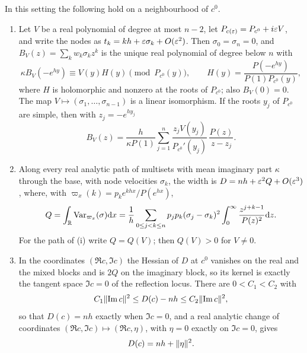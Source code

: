 \begin{theorem}\label{fil:thm:mirrorhessian}
In this setting the following hold on a neighbourhood of $c^0$.
\begin{enumerate}[label=\textup{(\roman*)}]
\item Let $V$ be a real polynomial of degree at most $n-2$, let $P_{c(\varepsilon)}=P_{c^0}+i\varepsilon V$, and write the nodes
as $t_k=kh+\varepsilon\sigma_k+O(\varepsilon^2)$. Then $\sigma_0=\sigma_n=0$, and $B_V(z)=\sum_kw_k\sigma_kz^k$ is the unique real
polynomial of degree below $n$ with
\begin{equation}\label{fil:eq:hermite}
 \kappa B_V(-e^{hy})\equiv V(y)H(y)\pmod{P_{c^0}(y)},\qquad H(y)=\frac{P(-e^{hy})}{P(1)P_{c^0}(y)},
\end{equation}
where $H$ is holomorphic and nonzero at the roots of $P_{c^0}$; also $B_V(0)=0$. The map
$V\mapsto(\sigma_1,\dots,\sigma_{n-1})$ is a linear isomorphism. If the roots $y_j$ of $P_{c^0}$ are simple, then
with $z_j=-e^{hy_j}$
\[
 B_V(z)=\frac h{\kappa P(1)}\sum_{j=1}^n\frac{z_jV(y_j)}{P_{c^0}'(y_j)}\,\frac{P(z)}{z-z_j}.
\]
\item Along every real analytic path of multisets with mean imaginary part $\kappa$ through the base, with node
velocities $\sigma_k$, the width is $D=nh+\varepsilon^2Q+O(\varepsilon^3)$, where, with $\varpi_x(k)=p_ke^{khx}/P(e^{hx})$,
\begin{equation}\label{fil:eq:mirrorvar}
 Q=\int_{\mathbb{R}}\operatorname{Var}_{\varpi_x}(\sigma)\mathrm{d} x
 =\frac1h\sum_{0\le j<k\le n}p_jp_k(\sigma_j-\sigma_k)^2\int_0^\infty\frac{z^{j+k-1}}{P(z)^2}\mathrm{d} z .
\end{equation}
For the path of \textup{(i)} write $Q=Q(V)$; then $Q(V)>0$ for $V\ne0$.
\item In the coordinates $(\Re c,\Im c)$ the Hessian of $D$ at $c^0$ vanishes on the real and the mixed
blocks and is $2Q$ on the imaginary block, so its kernel is exactly the tangent space $\Im c=0$ of the
reflection locus. There are $0<C_1<C_2$ with
\[
 C_1\lVert\operatorname{Im} c\rVert^2\le D(c)-nh\le C_2\lVert\operatorname{Im} c\rVert^2 ,
\]
so that $D(c)=nh$ exactly when $\Im c=0$, and a real analytic change of coordinates
$(\Re c,\Im c)\mapsto(\Re c,\eta)$, with $\eta=0$ exactly on $\Im c=0$, gives
\[
 D(c)=nh+\lVert\eta\rVert^2 .
\]
\end{enumerate}
\end{theorem}

